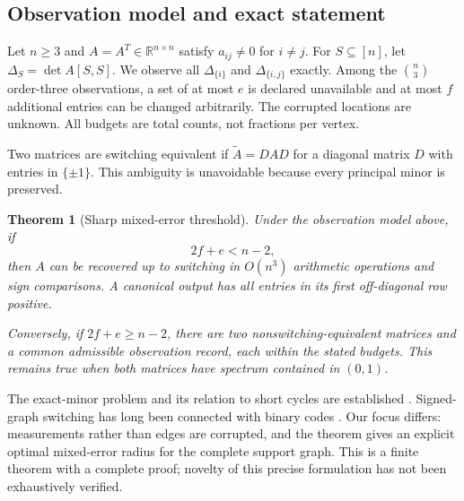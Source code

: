 \documentclass[11pt,a4paper]{article}
\newtheorem{theorem}{Theorem}[section]
\theoremstyle{definition}\newtheorem{definition}[theorem]{Definition}
\theoremstyle{remark}\newtheorem{remark}[theorem]{Remark}
\newcommand{\R}{\mathbb R}\newcommand{\C}{\mathbb C}\newcommand{\N}{\mathbb N}
\numberwithin{equation}{section}
\begin{document}
\subsection{Observation model and exact statement}\label{S02-sec-1}
Let $n\ge3$ and $A=A^T\in\R^{n\times n}$ satisfy $a_{ij}\ne0$ for $i\ne j$. For $S\subseteq[n]$, let $\Delta_S=\det A[S,S]$. We observe all $\Delta_{\{i\}}$ and $\Delta_{\{i,j\}}$ exactly. Among the $\binom n3$ order-three observations, a set of at most $e$ is declared unavailable and at most $f$ additional entries can be changed arbitrarily. The corrupted locations are unknown. All budgets are total counts, not fractions per vertex.

Two matrices are switching equivalent if $\widetilde A=DAD$ for a diagonal matrix $D$ with entries in $\{\pm1\}$. This ambiguity is unavoidable because every principal minor is preserved.

\begin{theorem}[Sharp mixed-error threshold]\label{S02-thm:main}
Under the observation model above, if
\begin{equation}\label{S02-eq:threshold}
 2f+e<n-2,
\end{equation}
then $A$ can be recovered up to switching in $O(n^3)$ arithmetic operations and sign comparisons. A canonical output has all entries in its first off-diagonal row positive.

Conversely, if $2f+e\ge n-2$, there are two nonswitching-equivalent matrices and a common admissible observation record, each within the stated budgets. This remains true when both matrices have spectrum contained in $(0,1)$.
\end{theorem}

The exact-minor problem and its relation to short cycles are established \cite{ref003}. Signed-graph switching has long been connected with binary codes \cite{ref004}. Our focus differs: measurements rather than edges are corrupted, and the theorem gives an explicit optimal mixed-error radius for the complete support graph. This is a finite theorem with a complete proof; novelty of this precise formulation has not been exhaustively verified.
\end{document}
